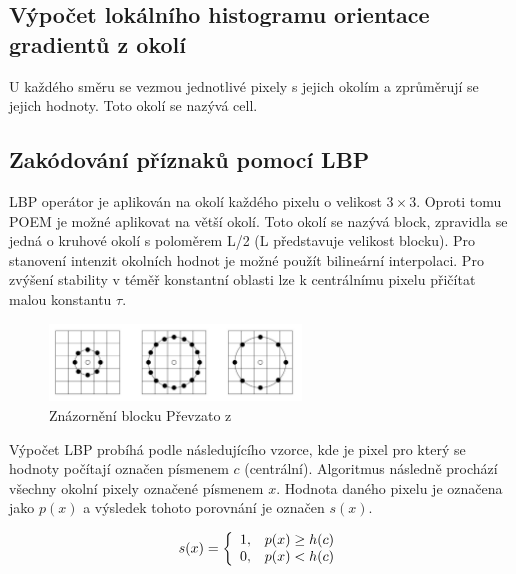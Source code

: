 \documentclass[czech,BP]{thesiskiv}
\begin{document}
\subsection{Výpočet lokálního histogramu orientace gradientů z okolí}
U každého směru  se vezmou jednotlivé pixely s jejich okolím a zprůměrují se jejich hodnoty. Toto okolí se nazývá cell. \\

\subsection{Zakódování příznaků pomocí LBP}
\par LBP operátor je aplikován na okolí každého pixelu o velikost $3 \times 3$. Oproti tomu POEM je možné aplikovat na větší okolí. Toto okolí se nazývá block, zpravidla se jedná o kruhové okolí s poloměrem L/2 (L představuje velikost blocku). Pro stanovení intenzit okolních hodnot je možné použít bilineární interpolaci. Pro zvýšení stability v téměř konstantní oblasti lze k centrálnímu pixelu přičítat malou konstantu $\tau$. 

\begin{figure}[H]
		\centering
		\includegraphics[width=253px]{./img/znazorneni_lbp.png}	
		\caption{Znázornění blocku Převzato z \cite{SrovnaniDeskriptoru}}
\end{figure}

\par Výpočet LBP probíhá podle následujícího vzorce, kde je pixel pro který se hodnoty počítají označen písmenem $c$ (centrální). Algoritmus následně prochází všechny okolní pixely označené písmenem  $x$. Hodnota daného pixelu je označena jako $p(x)$ a výsledek tohoto porovnání je označen $s(x)$.

\begin{displaymath} 
	\label{asd2} 
		    s(x) = \left\{ \begin{array}{r@{\quad}c}
    		1, & p(x) \geq h(c) \\
    		0, & p(x) < h(c) \\ \end{array} \right. 
\end{displaymath}
\end{document}
